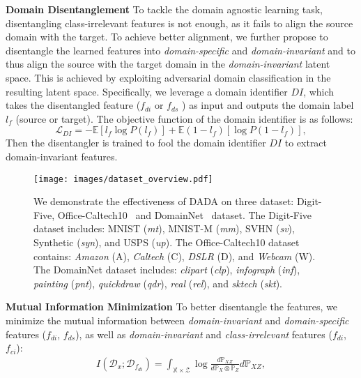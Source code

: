 \documentclass{article}
\begin{document}
\textbf{Domain Disentanglement} To tackle the domain agnostic learning task, 
disentangling class-irrelevant features is not enough, as it fails to align the source domain with the target. To achieve better alignment, we further propose 
to disentangle the learned features into \textit{domain-specific} and \textit{domain-invariant} and to thus align the source with the target domain in the \textit{domain-invariant} latent space. This is achieved by exploiting adversarial domain classification in the resulting latent space. Specifically, we leverage a domain identifier $DI$, which takes the disentangled feature ($f_{di}$ or $f_{ds}$ ) as input and outputs the domain label $l_f$ (source or target). The objective function of the domain identifier is as follows:
\begin{equation}
\label{eqn_domain_identifier}
\mathcal{L}_{DI} = - \mathbb{E}[l_f\log P( l_f)]  + \mathbb{E}(1-l_f)[\log P(1-l_f )],
\end{equation}
Then the disentangler is trained to fool the domain identifier $DI$ to extract domain-invariant features.


\begin{figure*}[t]
    \centering
    \texttt{[image: images/dataset\_overview.pdf]}
    \vspace{-0.6cm}
    \caption{We demonstrate the effectiveness of DADA on three dataset: Digit-Five, Office-Caltech10~\cite{gong2012geodesic} and DomainNet~\cite{domainnet} dataset. The Digit-Five dataset includes: MNIST (\textit{mt}), MNIST-M (\textit{mm}), SVHN (\textit{sv}), Synthetic (\textit{syn}), and USPS (\textit{up}). The Office-Caltech10 dataset contains: \textit{Amazon} (A), \textit{Caltech} (C), \textit{DSLR} (D), and \textit{Webcam} (W). The DomainNet dataset includes: \textit{clipart} (\textit{clp}), \textit{infograph} (\textit{inf}), \textit{painting} (\textit{pnt}), \textit{quickdraw} (\textit{qdr}), \textit{real} (\textit{rel}), and \textit{sktech} (\textit{skt}).} 

    \label{fig_dataset_overview}
\end{figure*} \newcommand{\PJ}[2]{\mathbb{P}_{#1#2}} 
\newcommand{\PJE}[2]{\mathbb{P}^{n}_{#1#2}}  
\newcommand{\PI}[2]{\mathbb{P}_{#1}\otimes\mathbb{P}_{#2}}  
\textbf{Mutual Information Minimization} To better disentangle the features, we minimize the mutual information between \textit{domain-invariant} and \textit{domain-specific} features ($f_{di}$, $f_{ds}$), as well as \textit{domain-invariant} and \textit{class-irrelevant} features ($f_{di}$, $f_{ci}$):
\begin{align}
I(\mathcal{D}_{x}; \mathcal{D}_{f_{di}}) = \int_{\mathbb{X} \times \mathcal{Z}} \log{\frac{d\PJ{X}{Z}}{d\PI{X}{Z}}} d\PJ{X}{Z},
\label{eq:mutual_information}
\end{align}
\end{document}
